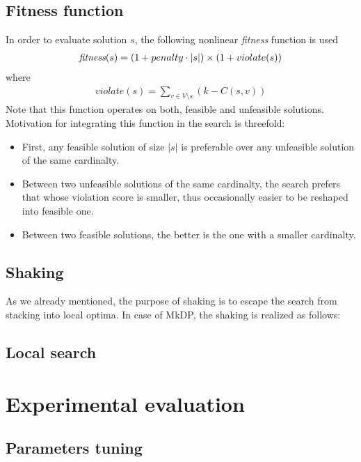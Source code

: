 \documentclass[sigconf]{acmart}
\begin{document}
   \subsection{Fitness function}
       In order to evaluate solution $s$, the following nonlinear \emph{fitness} function is used 
       \begin{align}
          \emph{fitness}(s) = ( 1+ penalty \cdot |s|) \times ( 1 + violate(s))
       \end{align}
       where 
       \begin{align}
       	   violate(s) = \sum_{v \in V \setminus s} ( k - C(s, v) ) 
       \end{align}
   Note that this function operates on both, feasible and unfeasible solutions. 
       Motivation for integrating this function  in the search is threefold:
       \begin{itemize}
       	\item First, any feasible solution of size $|s|$ is preferable over any unfeasible solution of the same cardinalty. 
       	\item Between two unfeasible solutions of the same cardinalty, the search prefers that whose violation score is smaller, thus occasionally easier to be reshaped into   feasible one.  
       	\item Between two feasible solutions, the better is the one with a smaller cardinalty. 
       \end{itemize}
   
   
   \subsection{Shaking}
    As we already mentioned, the purpose of shaking is to escape the search from stacking into   local optima. In case of MkDP, the shaking is realized as follows:  
   \subsection{Local search}
 

\section{Experimental evaluation}


\subsection{Parameters tuning}
\end{document}
